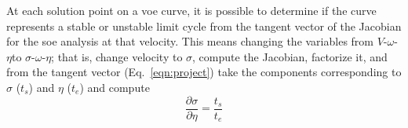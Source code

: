 \documentclass[11pt,openany,twoside]{book}
\numberwithin{equation}{section}		%
\newcommand{\VOE}{$V$-$\omega$-$\eta$\:}
\newcommand{\SOE}{$\sigma$-$\omega$-$\eta$\:}
\newcommand{\Eqn}[1]{Eq.\ \ref{#1}}  %
\begin{document}
\par
At each solution point on a voe curve, it is possible to
determine if the curve represents a stable or unstable limit cycle
from the tangent vector of the Jacobian for the soe analysis at that
velocity. This means changing the variables from \VOE to \SOE; that is,
change velocity to $\sigma$, compute the Jacobian, factorize it, and from
the tangent vector (\Eqn{eqn:project}) take the components corresponding
to $\sigma$ ($t_s$) and $\eta$ ($t_e$) and compute
\begin{equation}
\label{eqn:modtan}
\frac{\partial \sigma}{\partial \eta} = \frac{t_s}{t_e}
\end{equation}
\end{document}
